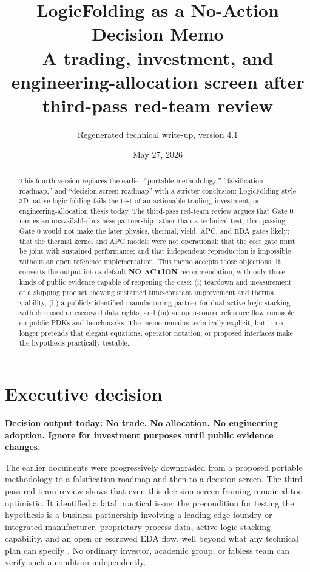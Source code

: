 \documentclass[11pt]{article}
\title{\textbf{LogicFolding as a No-Action Decision Memo}\\
\large A trading, investment, and engineering-allocation screen after third-pass red-team review}
\author{Regenerated technical write-up, version 4.1}
\date{May 27, 2026}
\begin{document}
\maketitle

\begin{abstract}
This fourth version replaces the earlier ``portable methodology,'' ``falsification roadmap,'' and ``decision-screen roadmap'' with a stricter conclusion: LogicFolding-style 3D-native logic folding fails the test of an actionable trading, investment, or engineering-allocation thesis today. The third-pass red-team review argues that Gate 0 names an unavailable business partnership rather than a technical test; that passing Gate 0 would not make the later physics, thermal, yield, APC, and EDA gates likely; that the thermal kernel and APC models were not operational; that the cost gate must be joint with sustained performance; and that independent reproduction is impossible without an open reference implementation. This memo accepts those objections. It converts the output into a default 
\textbf{NO ACTION} recommendation, with only three kinds of public evidence capable of reopening the case: (i) teardown and measurement of a shipping product showing sustained time-constant improvement and thermal viability, (ii) a publicly identified manufacturing partner for dual-active-logic stacking with disclosed or escrowed data rights, and (iii) an open-source reference flow runnable on public PDKs and benchmarks. The memo remains technically explicit, but it no longer pretends that elegant equations, operator notation, or proposed interfaces make the hypothesis practically testable.
\end{abstract}

\tableofcontents
\clearpage

\section{Executive decision}
\textbf{Decision output today: No trade. No allocation. No engineering adoption. Ignore for investment purposes until public evidence changes.}

The earlier documents were progressively downgraded from a proposed portable methodology to a falsification roadmap and then to a decision screen. The third-pass red-team review shows that even this decision-screen framing remained too optimistic. It identified a fatal practical issue: the precondition for testing the hypothesis is a business partnership involving a leading-edge foundry or integrated manufacturer, proprietary process data, active-logic stacking capability, and an open or escrowed EDA flow, well beyond what any technical plan can specify \cite{UserRedTeam3}. No ordinary investor, academic group, or fabless team can verify such a condition independently.
\end{document}
